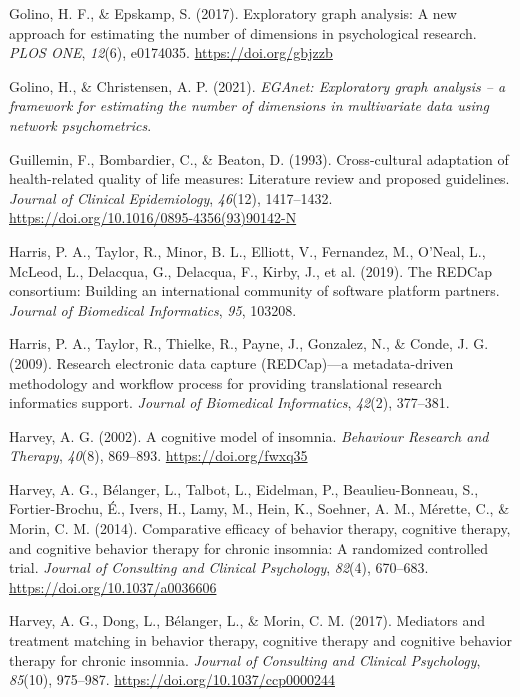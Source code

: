 \documentclass[
  ,doc,11pt, twoside,floatsintext]{apa6}
\newlength{\cslhangindent}
\newlength{\cslentryspacingunit} %
\newenvironment{CSLReferences}[2] %
 {%
  \setlength{\parindent}{0pt}
  \ifodd #1
  \let\oldpar\par
  \def\par{\hangindent=\cslhangindent\oldpar}
  \fi
  \setlength{\parskip}{#2\cslentryspacingunit}
 }%
 {}
\begin{document}
\begin{CSLReferences}{1}{0}
\leavevmode{}%
Golino, H. F., \& Epskamp, S. (2017). Exploratory graph analysis: {A} new approach for estimating the number of dimensions in psychological research. \emph{PLOS ONE}, \emph{12}(6), e0174035. \url{https://doi.org/gbjzzb}

\leavevmode{}%
Golino, H., \& Christensen, A. P. (2021). \emph{EGAnet: Exploratory graph analysis -- a framework for estimating the number of dimensions in multivariate data using network psychometrics}.

\leavevmode{}%
Guillemin, F., Bombardier, C., \& Beaton, D. (1993). Cross-cultural adaptation of health-related quality of life measures: {Literature} review and proposed guidelines. \emph{Journal of Clinical Epidemiology}, \emph{46}(12), 1417--1432. \url{https://doi.org/10.1016/0895-4356(93)90142-N}

\leavevmode{}%
Harris, P. A., Taylor, R., Minor, B. L., Elliott, V., Fernandez, M., O'Neal, L., McLeod, L., Delacqua, G., Delacqua, F., Kirby, J., et al. (2019). The REDCap consortium: Building an international community of software platform partners. \emph{Journal of Biomedical Informatics}, \emph{95}, 103208.

\leavevmode{}%
Harris, P. A., Taylor, R., Thielke, R., Payne, J., Gonzalez, N., \& Conde, J. G. (2009). Research electronic data capture (REDCap)---a metadata-driven methodology and workflow process for providing translational research informatics support. \emph{Journal of Biomedical Informatics}, \emph{42}(2), 377--381.

\leavevmode{}%
Harvey, A. G. (2002). A cognitive model of insomnia. \emph{Behaviour Research and Therapy}, \emph{40}(8), 869--893. \url{https://doi.org/fwxq35}

\leavevmode{}%
Harvey, A. G., Bélanger, L., Talbot, L., Eidelman, P., Beaulieu-Bonneau, S., Fortier-Brochu, É., Ivers, H., Lamy, M., Hein, K., Soehner, A. M., Mérette, C., \& Morin, C. M. (2014). Comparative efficacy of behavior therapy, cognitive therapy, and cognitive behavior therapy for chronic insomnia: A randomized controlled trial. \emph{Journal of Consulting and Clinical Psychology}, \emph{82}(4), 670--683. \url{https://doi.org/10.1037/a0036606}

\leavevmode{}%
Harvey, A. G., Dong, L., Bélanger, L., \& Morin, C. M. (2017). Mediators and treatment matching in behavior therapy, cognitive therapy and cognitive behavior therapy for chronic insomnia. \emph{Journal of Consulting and Clinical Psychology}, \emph{85}(10), 975--987. \url{https://doi.org/10.1037/ccp0000244}


\end{CSLReferences}
\end{document}
